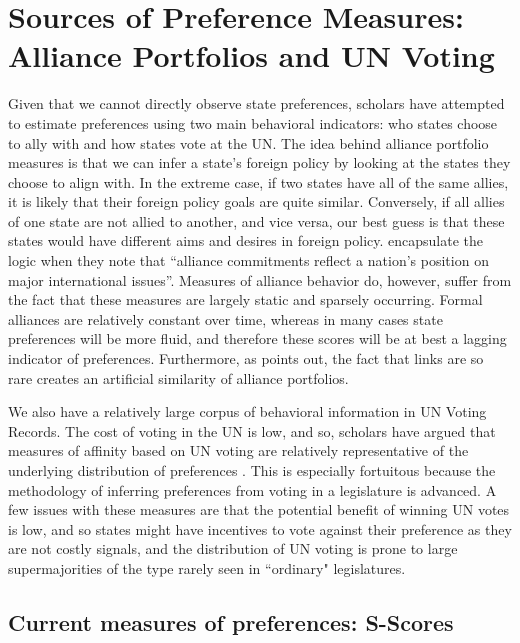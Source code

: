 \section*{Sources of Preference Measures: Alliance Portfolios and UN Voting}

Given that we cannot directly observe state preferences, scholars have attempted to estimate preferences using two main behavioral indicators: who states choose to ally with and how states vote at the UN. The idea behind alliance portfolio measures is that we can infer a state's foreign policy by looking at the states they choose to align with. In the extreme case, if two states have all of the same allies, it is likely that their foreign policy goals are quite similar. Conversely, if all allies of one state are not allied to another, and vice versa, our best guess is that these states would have different aims and desires in foreign policy. \citet{buenodemesquita:lalman:2008} encapsulate the logic when they note that ``alliance commitments reflect a nation's position on major international issues''. Measures of alliance behavior do, however, suffer from the fact that these measures are largely static and sparsely occurring. Formal alliances are relatively constant over time, whereas in many cases state preferences will be more fluid, and therefore these scores will be at best a lagging indicator of preferences. Furthermore, as \citet{hage:2011} points out, the fact that links are so rare creates an artificial similarity of alliance portfolios.

We also have a relatively large corpus of behavioral information in UN Voting Records. The cost of voting in the UN is low, and so, scholars have argued that measures of affinity based on UN voting are relatively representative of the underlying distribution of preferences \citep{gartzke:1998}. This is especially fortuitous because the methodology of inferring preferences from voting in a legislature is advanced. A few issues with these measures are that the potential benefit of winning UN votes is low, and so states might have incentives to vote against their preference as they are not costly signals, and the distribution of UN voting is prone to large supermajorities of the type rarely seen in ``ordinary" legislatures.

\subsection*{Current measures of preferences: S-Scores}

